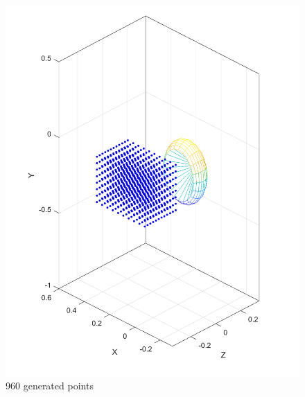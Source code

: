 \begin{figure}[h!]
    \centering
   \includegraphics[width=0.4\linewidth]{Pictures/Results/960points.png}
    \caption{960 generated points}
    \label{fig:960 points}
\end{figure}

